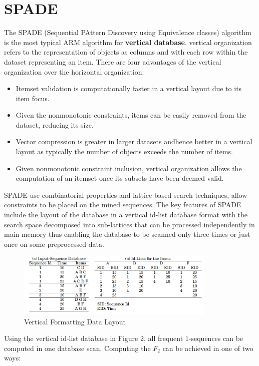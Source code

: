 \documentclass[sigplan, screen]{acmart}
\begin{document}
\section{SPADE}
The SPADE (Sequential PAttern Discovery using Equivalence classes) algorithm\cite{zaki2001spade} is the most typical ARM algorithm for \textbf{vertical database}.
vertical organization refers to the representation of objects as columns and with each
row within the dataset representing an item. There are four advantages of the vertical organization over the horizontal
organization\cite{shenoy2000turbo}:
\begin{itemize}
  \item Itemset validation is computationally faster in a vertical layout due to its item focus.
  \item Given the nonmonotonic constraints, items can be easily removed from the dataset, reducing its size.
  \item Vector compression is greater in larger datasets andhence better in a vertical layout as typically the number of objects exceeds the number of items.
  \item Given nonmonotonic constraint inclusion, vertical organization allows the computation of an itemset once its subsets have been deemed
  valid.
\end{itemize}
SPADE use combinatorial properties and lattice-based search techniques, allow constraints to
be placed on the mined sequences. The key features of SPADE include the layout of the database in a vertical id-list
database format with the search space decomposed into sub-lattices that can be processed independently in main memory 
thus enabling the database to be scanned only three times or just once on some preprocessed data.
\begin{figure}[htbp]
  \centering
  \includegraphics[width=0.85\textwidth]{figures/vertical}
  \caption{Vertical Formatting Data Layout\cite{zaki2001spade}}
\end{figure}
Using the vertical id-list database in Figure 2, all frequent 1-sequences can be
computed in one database scan. Computing the $F_{2}$ can be achieved in one of two ways:
\end{document}
